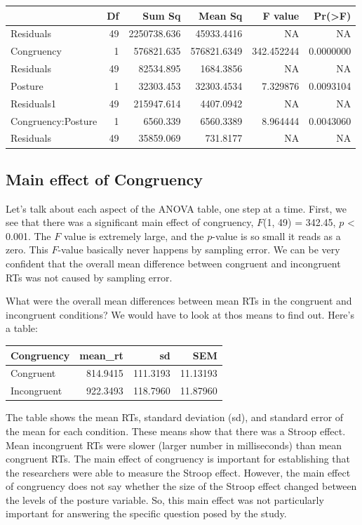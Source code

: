 \documentclass[]{book}
\begin{document}
\begin{tabular}{l|r|r|r|r|r}
\hline
  & Df & Sum Sq & Mean Sq & F value & Pr(>F)\\
\hline
Residuals & 49 & 2250738.636 & 45933.4416 & NA & NA\\
\hline
Congruency & 1 & 576821.635 & 576821.6349 & 342.452244 & 0.0000000\\
\hline
Residuals & 49 & 82534.895 & 1684.3856 & NA & NA\\
\hline
Posture & 1 & 32303.453 & 32303.4534 & 7.329876 & 0.0093104\\
\hline
Residuals1 & 49 & 215947.614 & 4407.0942 & NA & NA\\
\hline
Congruency:Posture & 1 & 6560.339 & 6560.3389 & 8.964444 & 0.0043060\\
\hline
Residuals & 49 & 35859.069 & 731.8177 & NA & NA\\
\hline
\end{tabular}

\hypertarget{main-effect-of-congruency}{%
\subsection{Main effect of Congruency}\label{main-effect-of-congruency}}

Let's talk about each aspect of the ANOVA table, one step at a time. First, we see that there was a significant main effect of congruency, \(F\)(1, 49) = 342.45, \(p\) \textless{} 0.001. The \(F\) value is extremely large, and the \(p\)-value is so small it reads as a zero. This \(F\)-value basically never happens by sampling error. We can be very confident that the overall mean difference between congruent and incongruent RTs was not caused by sampling error.

What were the overall mean differences between mean RTs in the congruent and incongruent conditions? We would have to look at thos means to find out. Here's a table:

\begin{tabular}{l|r|r|r}
\hline
Congruency & mean\_rt & sd & SEM\\
\hline
Congruent & 814.9415 & 111.3193 & 11.13193\\
\hline
Incongruent & 922.3493 & 118.7960 & 11.87960\\
\hline
\end{tabular}

The table shows the mean RTs, standard deviation (sd), and standard error of the mean for each condition. These means show that there was a Stroop effect. Mean incongruent RTs were slower (larger number in milliseconds) than mean congruent RTs. The main effect of congruency is important for establishing that the researchers were able to measure the Stroop effect. However, the main effect of congruency does not say whether the size of the Stroop effect changed between the levels of the posture variable. So, this main effect was not particularly important for answering the specific question posed by the study.
\end{document}
